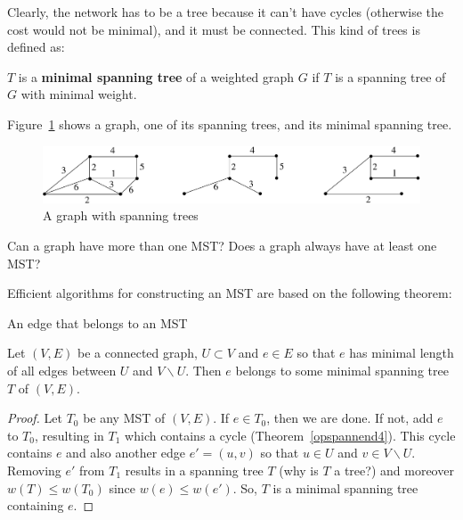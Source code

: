 Clearly, the network has to be a tree because it can't have cycles
(otherwise the cost would not be minimal), and it must be connected.
This kind of trees is defined as:

 \begin{definition}
\textup{$T$ is a \textbf{minimal spanning tree} of a weighted graph
$G$ if $T$ is a spanning tree of $G$ with minimal weight.}
\end{definition}

Figure~\ref{opspannend1} shows a graph, one of its spanning trees, and
its minimal spanning tree.

\begin{figure}[ht]
\begin{center}
\includegraphics[width=0.6\linewidth,keepaspectratio]{opspannend1}
\end{center}
\caption{A graph with spanning trees\label{opspannend1}}
\end{figure}

Can a graph have more than one MST? Does a graph always have at least
one MST?

Efficient algorithms for constructing an MST are based on the following
theorem:

\begin{theorem} An edge that belongs to an MST \label{even}

Let $(V,E)$ be a connected graph, $U \subset V$ and $e \in E$
so that $e$ has minimal length of all edges between $U$ and $V
\backslash U$. Then $e$ belongs to some minimal spanning tree $T$ of
$(V,E)$.
\end{theorem} %
\begin{proof} Let $T_{0}$ be any MST of $(V,E)$. If $e \in T_{0}$,
then we are done. If not, add $e$ to $T_{0}$, resulting in $T_{1}$
which contains a cycle (Theorem~\ref{opspannend4}). This cycle
contains $e$ and also another edge $e' = (u,v)$ so that $u \in U$ and
$v \in V \backslash U$. Removing $e'$ from $T_{1}$ results in a
spanning tree $T$ (why is $T$ a tree?) and moreover $w(T) \leq
w(T_{0})$ since $w(e) \leq w(e')$. So, $T$ is a minimal spanning tree
containing $e$.
\end{proof}


